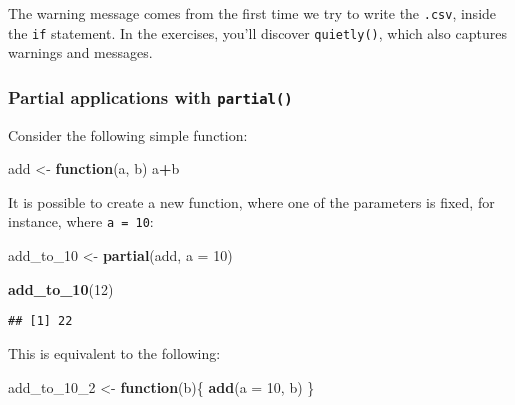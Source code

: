 \documentclass[
]{article}
\newenvironment{Shaded}{\begin{snugshade}}{\end{snugshade}}
\newcommand{\ControlFlowTok}[1]{\textcolor[rgb]{0.13,0.29,0.53}{\textbf{#1}}}
\newcommand{\DataTypeTok}[1]{\textcolor[rgb]{0.13,0.29,0.53}{#1}}
\newcommand{\DecValTok}[1]{\textcolor[rgb]{0.00,0.00,0.81}{#1}}
\newcommand{\KeywordTok}[1]{\textcolor[rgb]{0.13,0.29,0.53}{\textbf{#1}}}
\newcommand{\NormalTok}[1]{#1}
\newcommand{\OperatorTok}[1]{\textcolor[rgb]{0.81,0.36,0.00}{\textbf{#1}}}
\newcommand{\StringTok}[1]{\textcolor[rgb]{0.31,0.60,0.02}{#1}}
\begin{document}
The warning message comes from the first time we try to write the \texttt{.csv}, inside the \texttt{if}
statement. In the exercises, you'll discover \texttt{quietly()}, which also captures warnings and messages.

\hypertarget{partial-applications-with-partial}{%
\subsubsection{\texorpdfstring{Partial applications with \texttt{partial()}}{Partial applications with partial()}}\label{partial-applications-with-partial}}

Consider the following simple function:

\begin{Shaded}
\begin{Highlighting}[]
\NormalTok{add \textless{}{-}}\StringTok{ }\ControlFlowTok{function}\NormalTok{(a, b) a}\OperatorTok{+}\NormalTok{b}
\end{Highlighting}
\end{Shaded}

It is possible to create a new function, where one of the parameters is fixed, for instance, where
\texttt{a\ =\ 10}:

\begin{Shaded}
\begin{Highlighting}[]
\NormalTok{add\_to\_}\DecValTok{10}\NormalTok{ \textless{}{-}}\StringTok{ }\KeywordTok{partial}\NormalTok{(add, }\DataTypeTok{a =} \DecValTok{10}\NormalTok{)}
\end{Highlighting}
\end{Shaded}

\begin{Shaded}
\begin{Highlighting}[]
\KeywordTok{add\_to\_10}\NormalTok{(}\DecValTok{12}\NormalTok{)}
\end{Highlighting}
\end{Shaded}

\begin{verbatim}
## [1] 22
\end{verbatim}

This is equivalent to the following:

\begin{Shaded}
\begin{Highlighting}[]
\NormalTok{add\_to\_}\DecValTok{10}\NormalTok{\_}\DecValTok{2}\NormalTok{ \textless{}{-}}\StringTok{ }\ControlFlowTok{function}\NormalTok{(b)\{}
  \KeywordTok{add}\NormalTok{(}\DataTypeTok{a =} \DecValTok{10}\NormalTok{, b)}
\NormalTok{\}}
\end{Highlighting}
\end{Shaded}
\end{document}
